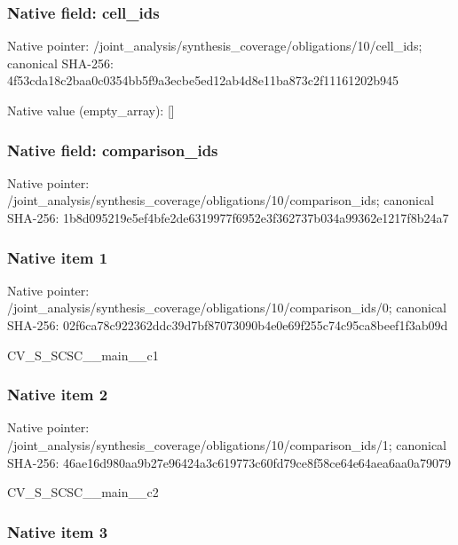 \documentclass[10pt,a4paper]{article}
\begin{document}
\subsubsection{Native field: cell\_ids}


Native pointer: /joint\_analysis/synthesi\allowbreak{}s\_coverage/obligations/1\allowbreak{}0/cell\_ids; canonical SHA-256: 4f53cda18c2baa0c0354bb5f\allowbreak{}9a3ecbe5ed12ab4d8e11ba87\allowbreak{}3c2f11161202b945



Native value (empty\_array): []



\subsubsection{Native field: comparison\_ids}


Native pointer: /joint\_analysis/synthesi\allowbreak{}s\_coverage/obligations/1\allowbreak{}0/comparison\_ids; canonical SHA-256: 1b8d095219e5ef4bfe2de631\allowbreak{}9977f6952e3f362737b034a9\allowbreak{}9362e1217f8b24a7



\subsubsection{Native item 1}


Native pointer: /joint\_analysis/synthesi\allowbreak{}s\_coverage/obligations/1\allowbreak{}0/comparison\_ids/0; canonical SHA-256: 02f6ca78c922362ddc39d7bf\allowbreak{}87073090b4e0e69f255c74c9\allowbreak{}5ca8beef1f3ab09d


CV\_S\_SCSC\_\_main\_\_c1


\subsubsection{Native item 2}


Native pointer: /joint\_analysis/synthesi\allowbreak{}s\_coverage/obligations/1\allowbreak{}0/comparison\_ids/1; canonical SHA-256: 46ae16d980aa9b27e96424a3\allowbreak{}c619773c60fd79ce8f58ce64\allowbreak{}e64aea6aa0a79079


CV\_S\_SCSC\_\_main\_\_c2


\subsubsection{Native item 3}
\end{document}
